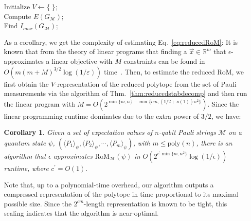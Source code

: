 \documentclass[10pt,aps,pra,twocolumn,floatfix,nofootinbib,superscriptaddress,longbibliography]{revtex4-2}
\newcommand{\1}{\mathbbm{1}}
\newtheorem{cor}[thm]{Corollary}
\begin{document}
\begin{algorithm}[H]
\caption{V-representation of STAB($\mathcal{M}$) \label{alg:Vrep}}
    Initialize $V \gets \{\;\}$;\\
    Compute $E(G_\mathcal{M})$;\\
    Find $I_{max}(G_\mathcal{M})$;\\
\end{algorithm}
As a corollary, we get the complexity of estimating Eq.~\eqref{eq:reducedRoM}: It is known that from the theory of linear programs that finding a $\vec{x} \in \mathbb R^m$ that $\epsilon$-approximates a linear objective with $M$ constraints can be found in $O(m (m+ M)^{3/2}\log(1/\varepsilon))$ time~\cite{vaidya1989speeding}. Then, to estimate the reduced RoM, we first obtain the $V$-representation of the reduced polytope from the set of Pauli measurements via the algorithm of Thm.~\ref{thm:reducedstabdecomp} and then run the linear program with $M =O(2^{\min\{m,n\}+ \min\{cm,(1/2+o(1))n^2\}})$. Since the linear programming runtime dominates due to the extra power of $3/2$, we have:
\begin{cor}
    Given a set of expectation values of $n$-qubit Pauli strings $\mathcal M$ on a quantum state $\psi$, $(\langle P_1\rangle_\psi, \langle P_2\rangle_\psi, \cdots, \langle P_m \rangle_\psi)$, with $m \leq  \mathrm{poly}(n)$, there is an algorithm that $\epsilon$-approximates $\mathrm{RoM}_\mathcal M(\psi)$ in $O(2^{c^\prime \min\{m,n^2\}}\log(1/\epsilon))$ runtime, where $c^\prime=O(1)$. 
\end{cor}


Note that, up to a polynomial-time overhead, our algorithm outputs a compressed representation of the polytope in time proportional to its maximal possible size. Since the $2^{c m}$-length representation is known to be tight, this scaling indicates that the algorithm is near-optimal.
\end{document}

